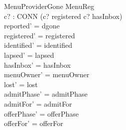 \documentclass[a4paper,10pt,fleqn]{article}
\begin{document}
\begin{schema}{MenuProviderGone}
  \Delta MenuReg \\
  c? : CONN
\where
  \lnot (c? \in registered \land c? \in hasInbox) \\
  reported' = dgone \\
  registered' = registered \\
  identified' = identified \\
  lapsed' = lapsed \\
  hasInbox' = hasInbox \\
  menuOwner' = menuOwner \\
  lost' = lost \\
  admitPhase' = admitPhase \\
  admitFor' = admitFor \\
  offerPhase' = offerPhase \\
  offerFor' = offerFor
\end{schema}
\end{document}
